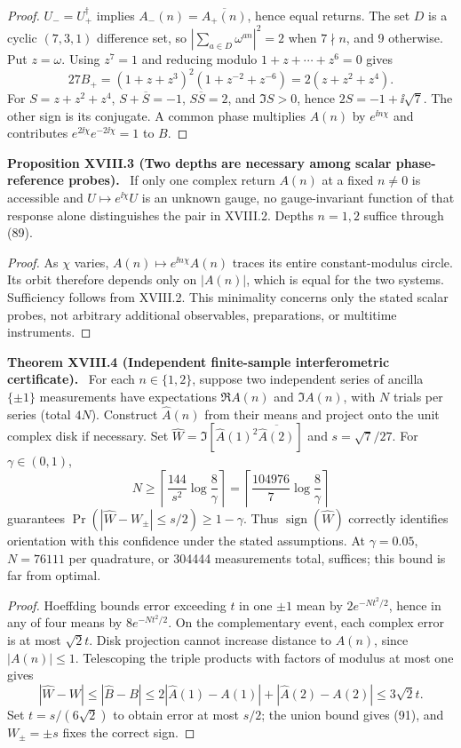 \documentclass[11pt,a4paper,oneside]{book}
\newcommand{\statement}[3]{\par\medskip\noindent\textbf{#1 #2 (#3).}\ }
\begin{document}
\begin{proof}$U_-=U_+^\dagger$ implies $A_-(n)=\overline{A_+(n)}$, hence equal returns. The set $D$ is a cyclic $(7,3,1)$ difference set, so $|\sum_{a\in D}\omega^{an}|^2=2$ when $7\nmid n$, and 9 otherwise. Put $z=\omega$. Using $z^7=1$ and reducing modulo $1+z+\cdots+z^6=0$ gives
\[27B_+=(1+z+z^3)^2(1+z^{-2}+z^{-6})=2(z+z^2+z^4).\]
For $S=z+z^2+z^4$, $S+\overline S=-1$, $S\overline S=2$, and $\Im S>0$, hence $2S=-1+\ii\sqrt7$. The other sign is its conjugate. A common phase multiplies $A(n)$ by $e^{\ii n\chi}$ and contributes $e^{2\ii\chi}e^{-2\ii\chi}=1$ to $B$.\end{proof}
\statement{Proposition}{XVIII.3}{Two depths are necessary among scalar phase-reference probes} If only one complex return $A(n)$ at a fixed $n\ne0$ is accessible and $U\mapsto e^{\ii\chi}U$ is an unknown gauge, no gauge-invariant function of that response alone distinguishes the pair in XVIII.2. Depths $n=1,2$ suffice through (89).
\begin{proof}As $\chi$ varies, $A(n)\mapsto e^{\ii n\chi}A(n)$ traces its entire constant-modulus circle. Its orbit therefore depends only on $|A(n)|$, which is equal for the two systems. Sufficiency follows from XVIII.2. This minimality concerns only the stated scalar probes, not arbitrary additional observables, preparations, or multitime instruments.\end{proof}
\statement{Theorem}{XVIII.4}{Independent finite-sample interferometric certificate} For each $n\in\{1,2\}$, suppose two independent series of ancilla $\{\pm1\}$ measurements have expectations $\Re A(n)$ and $\Im A(n)$, with $N$ trials per series (total $4N$). Construct $\widehat A(n)$ from their means and project onto the unit complex disk if necessary. Set $\widehat W=\Im[\widehat A(1)^2\overline{\widehat A(2)}]$ and $s=\sqrt7/27$. For $\gamma\in(0,1)$,
\begin{equation}N\ge\left\lceil\frac{144}{s^2}\log\frac8\gamma\right\rceil=\left\lceil\frac{104976}{7}\log\frac8\gamma\right\rceil\tag{91}\end{equation}
guarantees $\Pr(|\widehat W-W_\pm|\le s/2)\ge1-\gamma$. Thus $\operatorname{sign}(\widehat W)$ correctly identifies orientation with this confidence under the stated assumptions. At $\gamma=0.05$, $N=76111$ per quadrature, or 304444 measurements total, suffices; this bound is far from optimal.
\begin{proof}Hoeffding bounds error exceeding $t$ in one $\pm1$ mean by $2e^{-Nt^2/2}$, hence in any of four means by $8e^{-Nt^2/2}$. On the complementary event, each complex error is at most $\sqrt2t$. Disk projection cannot increase distance to $A(n)$, since $|A(n)|\le1$. Telescoping the triple products with factors of modulus at most one gives
\[|\widehat W-W|\le|\widehat B-B|\le2|\widehat A(1)-A(1)|+|\widehat A(2)-A(2)|\le3\sqrt2t.\]
Set $t=s/(6\sqrt2)$ to obtain error at most $s/2$; the union bound gives (91), and $W_\pm=\pm s$ fixes the correct sign.\end{proof}
\end{document}
